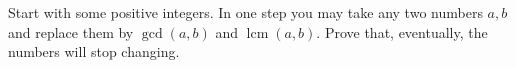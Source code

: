 Start with some positive integers. In one step you may take any two numbers $a, b$ and replace them by $\gcd(a, b)$ and $\operatorname{lcm}(a, b)$. Prove that, eventually, the numbers will stop changing.
